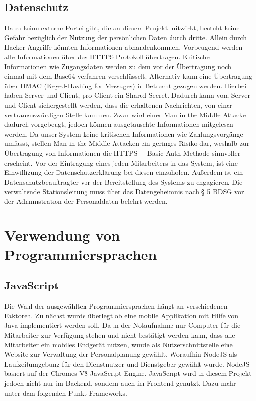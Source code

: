 \documentclass[11pt,
paper=a4,
bibtotocnumbered,	  %
liststotocnumbered,  %
DIV=calc,		  %
tablecaptionabove,	  %
headinclude,
]{article}
\begin{document}
\subsection{Datenschutz}
Da es keine externe Partei gibt, die an diesem Projekt mitwirkt, besteht keine Gefahr bezüglich der Nutzung der persönlichen Daten durch dritte. Allein durch Hacker Angriffe könnten Informationen abhandenkommen. Vorbeugend werden alle Informationen über das HTTPS Protokoll übertragen. Kritische Informationen wie Zugangsdaten werden zu dem vor der Übertragung noch einmal mit dem Base64 verfahren verschlüsselt. Alternativ kann eine Übertragung über HMAC (Keyed-Hashing for Messages) in Betracht gezogen werden. Hierbei haben Server und Client, pro Client ein Shared Secret. Dadurch kann vom Server und Client sichergestellt werden, dass die erhaltenen Nachrichten, von einer vertrauenswürdigen Stelle kommen. Zwar wird einer Man in the Middle Attacke dadurch vorgebeugt, jedoch können ausgetauschte Informationen mitgelesen werden. Da unser System keine kritischen Informationen wie Zahlungsvorgänge umfasst, stellen Man in the Middle Attacken ein geringes Risiko dar, weshalb zur Übertragung von Informationen die HTTPS + Basic-Auth Methode sinnvoller erscheint. Vor der Eintragung eines jeden Mitarbeiters in das System, ist eine Einwilligung der Datenschutzerklärung bei diesen einzuholen. Außerdem ist ein Datenschutzbeauftragter vor der Bereitstellung des Systems zu engagieren. Die verwaltende Stationsleitung muss über das Datengeheimnis nach § 5 BDSG vor der Administration der Personaldaten belehrt werden. 
\section{Verwendung von Programmiersprachen}
\subsection{JavaScript}
Die Wahl der ausgewählten Programmiersprachen hängt an verschiedenen Faktoren. Zu nächst wurde überlegt ob eine mobile Applikation mit Hilfe von Java implementiert werden soll. Da in der Notaufnahme nur Computer für die Mitarbeiter zur Verfügung stehen und nicht bestätigt werden kann, dass alle Mitarbeiter ein mobiles Endgerät nutzen, wurde als Nutzerschnittstelle eine Website zur Verwaltung der Personalplanung gewählt. Woraufhin NodeJS als Laufzeitumgebung für den Dienstnutzer und Dienstgeber gewählt wurde. NodeJS basiert auf der Chromes V8 JavaScript-Engine. JavaScript wird in diesem Projekt jedoch nicht nur im Backend, sondern auch im Frontend genutzt. Dazu mehr unter dem folgenden Punkt Frameworks.
\end{document}
